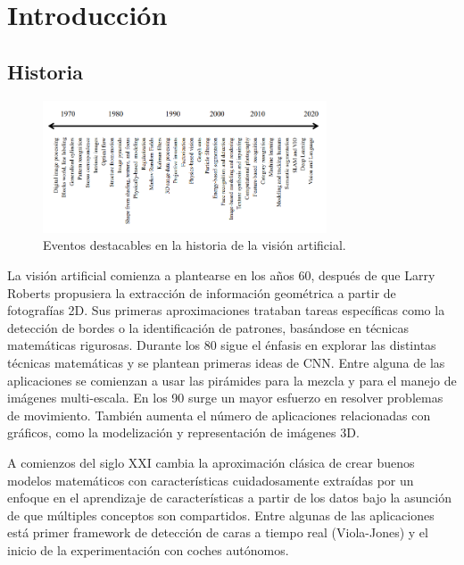 \section{Introducción}

\subsection{Historia}


\begin{figure}[h]
  \centerfloat
  \includegraphics[width=0.75\textwidth]{img/history.png}
  \caption{Eventos destacables en la historia de la visión artificial.}
\end{figure}

La visión artificial comienza a plantearse en los años 60, después de que Larry Roberts propusiera la extracción de información geométrica a partir de fotografías 2D.
Sus primeras aproximaciones trataban tareas específicas como la detección de bordes o la identificación de patrones, basándose en técnicas matemáticas rigurosas.
Durante los 80 sigue el énfasis en explorar las distintas técnicas matemáticas y se plantean primeras ideas de CNN. Entre alguna de las aplicaciones se comienzan a usar las pirámides para la mezcla y para el manejo de imágenes multi-escala.
En los 90 surge un mayor esfuerzo en resolver problemas de movimiento. También aumenta el número de aplicaciones relacionadas con gráficos, como la modelización y representación de imágenes 3D.

\vspace{\baselineskip}

A comienzos del siglo XXI cambia la aproximación clásica de crear buenos modelos matemáticos con características cuidadosamente extraídas por un enfoque en el aprendizaje de características a partir de los datos bajo la asunción de que múltiples conceptos son compartidos. Entre algunas de las aplicaciones está primer framework de detección de caras a tiempo real (Viola-Jones) y el inicio de la experimentación con coches autónomos.

